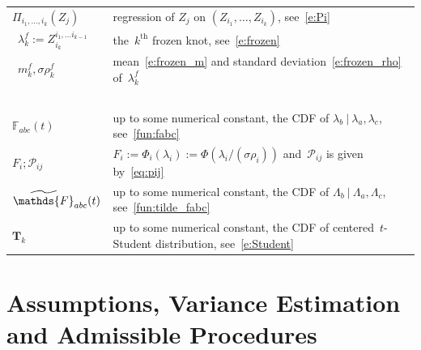 \documentclass[final,numbib]{imaiai}%
\numberwithin{equation}{section}
\def\bT{\boldsymbol{T}}
\def\bbF{\mathds{F}}
\renewcommand{\tilde}{\widetilde}
\def\\bUnif{\text{\bUnif}}
\newcommand{\<}{\langle}
\renewcommand{\>}{\rangle}
\newcommand{\1}{\mathds{1}}
\begin{document}
{{\begin{center}
{\begin{tabular}{ll}
		$ \Pi_{ i_1,\ldots, i_{k}} (Z_j)$ 
		&  regression of $Z_j$ on $(Z_{i_1},\ldots,Z_{i_k})$, see~\eqref{e:Pi}\\
		~$\lambda^f_{k} :=   Z^{i_1,\ldots i_{k-1}}_{i_{k}}$ 
		  & the~$k^{\text{th}}$ frozen knot, see~\eqref{e:frozen}\\
		~$m_k^f,\sigma\rho_k^f$ 
		 & mean~\eqref{e:frozen_m} and standard deviation~\eqref{e:frozen_rho} of~$\lambda^f_{k}$\\
		 {\ } & {\ }\\
		$\bbF_{abc}(t)$
		& up to some numerical constant, the CDF of $\lambda_b\ |\  \lambda_a,\lambda_c$, see~\eqref{fun:fabc} \\
		$ F_i;\mathcal P_{ij}$  
		&$F_i:=\Phi_i(\lambda_i) :=  \Phi(\lambda_i/(\sigma\rho_i))$ and~$\mathcal P_{ij}$ is given by~\eqref{eq:pij}\\
		$\tilde\bbF_{abc}(t)$
		& up to some numerical constant, the CDF of $\Lambda_b\ |\  \Lambda_a,\Lambda_c$, see~\eqref{fun:tilde_fabc}\\
		$\bT_k$
		& up to some numerical constant, the CDF of centered~$t$-Student distribution, see~\eqref{e:Student}%
	\end{tabular}}
\end{center}

\medskip


\section{Assumptions, Variance Estimation and Admissible Procedures}
\label{sec2}

}}
\end{document}
